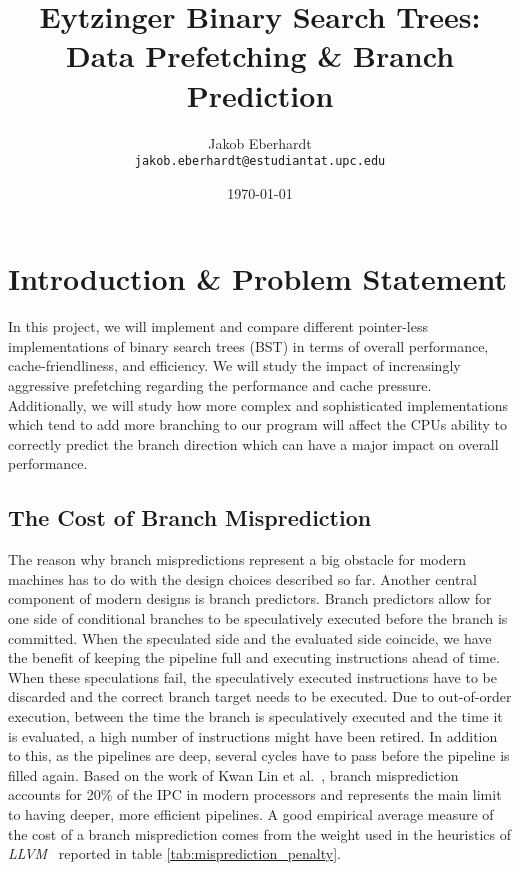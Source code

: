 \documentclass{article}
\title{Eytzinger Binary Search Trees: Data Prefetching \& Branch Prediction}
\author{Jakob Eberhardt \\ \texttt{jakob.eberhardt@estudiantat.upc.edu}}
\date{\today}
\begin{document}
\maketitle
\thispagestyle{empty}
\newpage
\setcounter{page}{1}
\tableofcontents
\lstlistoflistings
\listoffigures
\listoftables
\newpage 


\section{Introduction \& Problem Statement}
In this project, we will implement and compare different pointer-less implementations of binary search trees (BST) in terms of overall performance, cache-friendliness, and efficiency. We will study the impact of increasingly aggressive prefetching regarding the performance and cache pressure. Additionally, we will study how more complex and sophisticated implementations which tend to add more branching to our program will affect the CPUs ability to correctly predict the branch direction which can have a major impact on overall performance. 

\subsection{The Cost of Branch Misprediction}
\label{sec:costo_of_branch_prediction}
The reason why branch mispredictions represent a big obstacle for modern machines has to do with the design choices described so far. Another central component of modern designs is branch predictors. Branch predictors allow for one side of conditional branches to be speculatively executed before the branch is committed. When the speculated side and the evaluated side coincide, we have the benefit of keeping the pipeline full and executing instructions ahead of time. When these speculations fail, the speculatively executed instructions have to be discarded and the correct branch target needs to be executed. Due to out-of-order execution, between the time the branch is speculatively executed and the time it is evaluated, a high number of instructions might have been retired. In addition to this, as the pipelines are deep, several cycles have to pass before the pipeline is filled again. Based on the work of Kwan Lin et al.~\cite{lin2019branch}, branch misprediction accounts for 20\% of the IPC in modern processors and represents the main limit to having deeper, more efficient pipelines. A good empirical average measure of the cost of a branch misprediction comes from the weight used in the heuristics of \textit{LLVM}~\cite{Lattner2004LLVM} reported in table \ref{tab:misprediction_penalty}.
\end{document}
